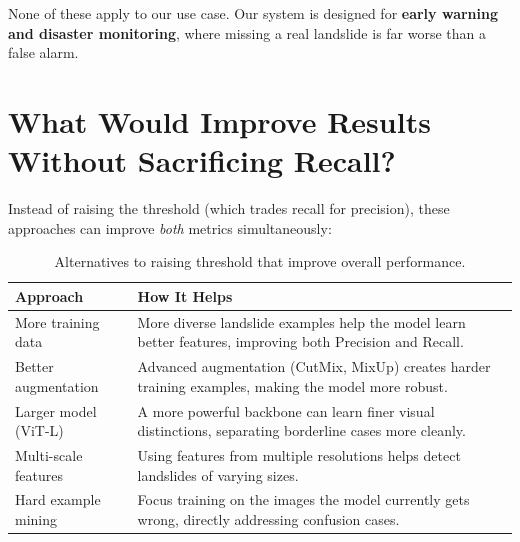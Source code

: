 \documentclass[11pt]{article}
\begin{document}
\noindent None of these apply to our use case. Our system is designed for \textbf{early warning and disaster monitoring}, where missing a real landslide is far worse than a false alarm.

\section{What Would Improve Results Without Sacrificing Recall?}

Instead of raising the threshold (which trades recall for precision), these approaches can improve \textit{both} metrics simultaneously:

\begin{table}[H]
\centering
\renewcommand{\arraystretch}{1.3}
\begin{tabularx}{\textwidth}{lX}
\toprule
\textbf{Approach} & \textbf{How It Helps} \\
\midrule
More training data       & More diverse landslide examples help the model learn better features, improving both Precision and Recall. \\
Better augmentation      & Advanced augmentation (CutMix, MixUp) creates harder training examples, making the model more robust. \\
Larger model (ViT-L)     & A more powerful backbone can learn finer visual distinctions, separating borderline cases more cleanly. \\
Multi-scale features     & Using features from multiple resolutions helps detect landslides of varying sizes. \\
Hard example mining      & Focus training on the images the model currently gets wrong, directly addressing confusion cases. \\
\bottomrule
\end{tabularx}
\caption{Alternatives to raising threshold that improve overall performance.}
\end{table}
\end{document}
